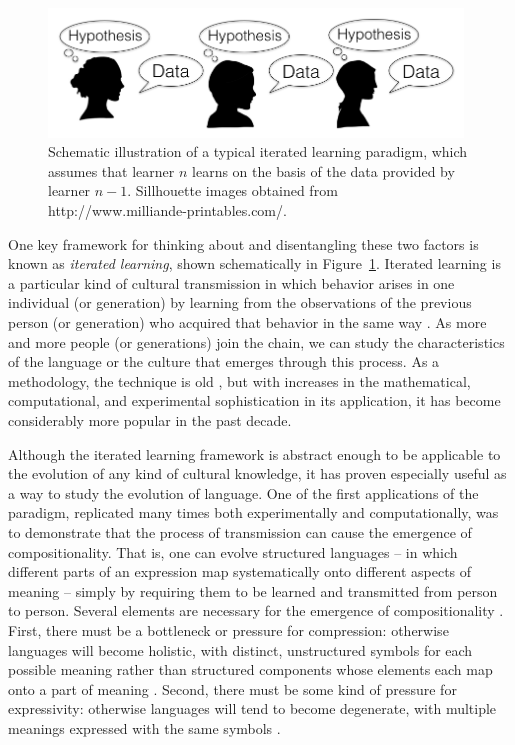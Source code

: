 \documentclass[doc]{apa6}
\begin{document}
\begin{figure}[t]
\begin{center}
\includegraphics[width=11cm]{iteratedlearningschema.png}
\caption{{\small Schematic illustration of a typical iterated learning paradigm, which assumes that learner $n$ learns on the basis of the data provided by learner $n-1$. Sillhouette images obtained from http://www.milliande-printables.com/.}}
\label{ilschema}
\end{center}
\end{figure}

One key framework for thinking about and disentangling these two factors is known as {\it iterated learning}, shown schematically in Figure~\ref{ilschema}. Iterated learning is a particular kind of cultural transmission in which behavior arises in one individual (or generation) by learning from the observations of the previous person (or generation) who acquired that behavior in the same way \parencite{kirbyetal14}. As more and more people (or generations) join the chain, we can study the characteristics of the language or the culture that emerges through this process. As a methodology, the technique is old \parencite{bartlett32}, but with increases in the mathematical, computational, and experimental sophistication in its application, it has become considerably more popular in the past decade.

Although the iterated learning framework is abstract enough to be applicable to the evolution of any kind of cultural knowledge, it has proven especially useful as a way to study the evolution of language. One of the first applications of the paradigm, replicated many times both experimentally and computationally, was to demonstrate that the process of transmission can cause the emergence of compositionality. That is, one can evolve structured languages -- in which different parts of an expression map systematically onto different aspects of meaning -- simply by requiring them to be learned and transmitted from person to person. Several elements are necessary for the emergence of compositionality \parencite{kirbyetal15}. First, there must be a bottleneck or pressure for compression: otherwise languages will become holistic, with distinct, unstructured symbols for each possible meaning rather than structured components whose elements each map onto a part of meaning \parencite{kirby00,brightonetal05,fayellison13}. Second, there must be some kind of pressure for expressivity: otherwise languages will tend to become degenerate, with multiple meanings expressed with the same symbols \parencite{kirbyetal08,perforsnavarro14,silveyetal14}.
\end{document}
